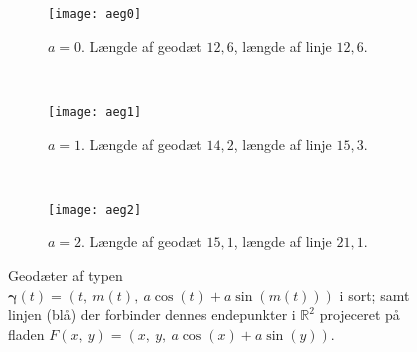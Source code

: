  \begin{figure}
        \centering
        \begin{subfigure}[b]{0.3\textwidth}
                \centering
                \texttt{[image: aeg0]}
                \caption{\(a=0\). Længde af geodæt \(12,6\), længde af linje \(12,6\).}
                \label{fig:aeg0}
        \end{subfigure}%
        ~ %
        \begin{subfigure}[b]{0.3\textwidth}
                \centering
                \texttt{[image: aeg1]}
                \caption{\(a=1\). Længde af geodæt \(14,2\), længde af linje \(15,3\).}
                \label{fig:aeg1}
        \end{subfigure}
        ~ %
        \begin{subfigure}[b]{0.3\textwidth}
                \centering
                \texttt{[image: aeg2]}
                \caption{\(a=2\). Længde af geodæt \(15,1\), længde af linje \(21,1\).}
                \label{fig:aeg2}
        \end{subfigure}
        \caption{
        Geodæter af typen \(\pmb{\gamma}(t) = (t,~m(t),~a\cos(t) + a\sin(m(t)))\) i sort;
        samt linjen (blå) der forbinder dennes endepunkter i \(\mathbb{R}^2\) projeceret på fladen \(F(x,~y)=(x,~y,~a\cos(x)+a\sin(y))\).}%
\end{figure}

